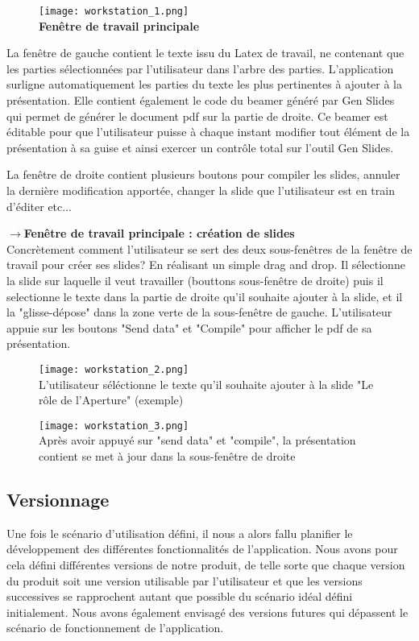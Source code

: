 \documentclass[12pt]{article}
\begin{document}
\begin{figure}[h!]
    \centering
    \texttt{[image: workstation\_1.png]} \\
    \textbf{Fenêtre de travail principale}
\end{figure}

\noindent
La fenêtre de gauche contient le texte issu du Latex de travail, ne contenant que les parties sélectionnées par l'utilisateur dans l'arbre des parties. L'application surligne automatiquement les parties du texte les plus pertinentes à ajouter à la présentation. Elle contient également le code du beamer généré par Gen Slides qui permet de générer le document pdf sur la partie de droite. Ce beamer est éditable pour que l'utilisateur puisse à chaque instant modifier tout élément de la présentation à sa guise et ainsi exercer un contrôle total sur l'outil Gen Slides.

\noindent
La fenêtre de droite contient plusieurs boutons pour compiler les slides, annuler la dernière modification apportée, changer la slide que l'utilisateur est en train d'éditer etc...

\noindent
$\longrightarrow$\textbf{Fenêtre de travail principale : création de slides}\\
Concrètement comment l'utilisateur se sert des deux sous-fenêtres de la fenêtre de travail pour créer ses slides? En réalisant un simple drag and drop. Il sélectionne la slide sur laquelle il veut travailler (bouttons sous-fenêtre de droite) puis il selectionne le texte dans la partie de droite qu'il souhaite ajouter à la slide, et il la "glisse-dépose" dans la zone verte de la sous-fenêtre de gauche. L'utilisateur appuie sur les boutons "Send data" et "Compile" pour afficher le pdf de sa présentation.

\begin{figure}[h!]
    \centering
    \texttt{[image: workstation\_2.png]}\\
    L'utilisateur séléctionne le texte qu'il souhaite ajouter à la slide "Le rôle de l'Aperture" (exemple)
\end{figure}

\begin{figure}[h!]
    \centering
    \texttt{[image: workstation\_3.png]} \\
    Après avoir appuyé sur "send data" et "compile", la présentation contient se met à jour dans la sous-fenêtre de droite
\end{figure}


\subsection{Versionnage}
\noindent
Une fois le scénario d'utilisation défini, il nous a alors fallu planifier le développement des différentes fonctionnalités de l'application. Nous avons pour cela défini différentes versions de notre produit, de telle sorte que chaque version du produit soit une version utilisable par l'utilisateur et que les versions successives se rapprochent autant que possible du scénario idéal défini initialement. Nous avons également envisagé des versions futures qui dépassent le scénario de fonctionnement de l'application.
\end{document}
